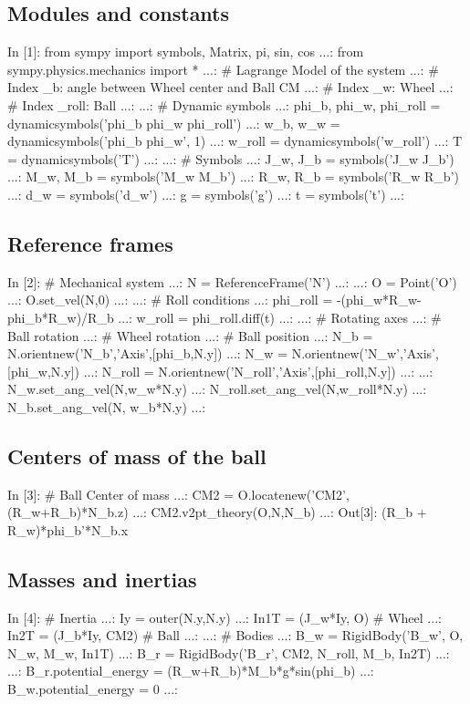 \subsection{Modules and constants}
\begin{code}
In [1]: from sympy import symbols, Matrix, pi, sin, cos
   ...: from sympy.physics.mechanics import *
   ...: # Lagrange Model of the system
   ...: # Index _b: angle between Wheel center and Ball CM
   ...: # Index _w: Wheel
   ...: # Index _roll: Ball
   ...: 
   ...: # Dynamic symbols
   ...: phi_b, phi_w, phi_roll = dynamicsymbols('phi_b phi_w phi_roll')
   ...: w_b, w_w = dynamicsymbols('phi_b phi_w', 1)
   ...: w_roll = dynamicsymbols('w_roll')
   ...: T = dynamicsymbols('T')
   ...: 
   ...: # Symbols
   ...: J_w, J_b = symbols('J_w J_b')
   ...: M_w, M_b = symbols('M_w M_b')
   ...: R_w, R_b = symbols('R_w R_b')
   ...: d_w     = symbols('d_w')
   ...: g      = symbols('g')
   ...: t      = symbols('t')
   ...: 
\end{code}

\subsection{Reference frames}
\begin{code}
In [2]: # Mechanical system
   ...: N = ReferenceFrame('N')
   ...: 
   ...: O = Point('O')
   ...: O.set_vel(N,0)
   ...: 
   ...: # Roll conditions
   ...: phi_roll = -(phi_w*R_w-phi_b*R_w)/R_b
   ...: w_roll = phi_roll.diff(t)
   ...: 
   ...: # Rotating axes
   ...: # Ball rotation
   ...: # Wheel rotation
   ...: # Ball position
   ...: N_b = N.orientnew('N_b','Axis',[phi_b,N.y])
   ...: N_w = N.orientnew('N_w','Axis',[phi_w,N.y])
   ...: N_roll = N.orientnew('N_roll','Axis',[phi_roll,N.y])
   ...: 
   ...: N_w.set_ang_vel(N,w_w*N.y)
   ...: N_roll.set_ang_vel(N,w_roll*N.y)
   ...: N_b.set_ang_vel(N, w_b*N.y)
   ...: 
\end{code}

\subsection{Centers of mass of the ball}
\begin{code}
In [3]: # Ball Center of mass
   ...: CM2 = O.locatenew('CM2',(R_w+R_b)*N_b.z)
   ...: CM2.v2pt_theory(O,N,N_b)
   ...: 
Out[3]: (R_b + R_w)*phi_b'*N_b.x
\end{code}

\subsection{Masses and inertias}
\begin{code}
In [4]: # Inertia
   ...: Iy = outer(N.y,N.y)
   ...: In1T = (J_w*Iy, O)       # Wheel
   ...: In2T = (J_b*Iy, CM2)   # Ball
   ...: 
   ...: # Bodies
   ...: B_w = RigidBody('B_w', O, N_w, M_w, In1T)
   ...: B_r = RigidBody('B_r', CM2, N_roll, M_b, In2T)
   ...: 
   ...: B_r.potential_energy = (R_w+R_b)*M_b*g*sin(phi_b)
   ...: B_w.potential_energy = 0
   ...: 
\end{code}

